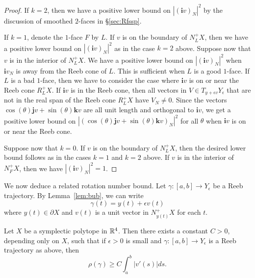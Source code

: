 \begin{proof}
If $k=2$, then we have a positive lower bound on $|({\mathbf i}v)_N|^2$ by the discussion of smoothed $2$-faces in \S\ref{sec:Rfssp}.

If $k=1$, denote the $1$-face $F$ by $L$. If $v$ is on the boundary of $N_L^+X$, then we have a positive lower bound on $|({\mathbf i}v)_N|^2$ as in the case $k=2$ above. Suppose now that $v$ is in the interior of $N_L^+X$. We have a positive lower bound on $|({\mathbf i}v)_N|^2$ when ${\mathbf i}v_N$ is away from the Reeb cone of $L$. This is sufficient when $L$ is a good $1$-face. If $L$ is a bad $1$-face, then we have to consider the case where ${\mathbf i}v$ is on or near the Reeb cone $R_L^+X$. If ${\mathbf i}v$ is in the Reeb cone, then all vectors in $V\in T_{y+\epsilon v}Y_\epsilon$ that are not in the real span of the Reeb cone $R_L^+X$ have $V_N\neq 0$. Since the vectors $\cos(\theta){\mathbf j}v + \sin(\theta){\mathbf k}v$ are all unit length and orthogonal to ${\mathbf i}v$, we get a positive lower bound on $\left|(\cos(\theta){\mathbf j}v + \sin(\theta){\mathbf k}v)_N\right|^2$ for all $\theta$ when ${\mathbf i}v$ is on or near the Reeb cone.

Suppose now that $k=0$. If $v$ is on the boundary of $N_L^+X$, then the desired lower bound follows as in the cases $k=1$ and $k=2$ above. If $v$ is in the interior of $N_F^+X$, then we have $|({\mathbf i}v)_N|^2=1$.
\end{proof}

We now deduce a related rotation number bound. Let $\gamma:[a,b]\to Y_\epsilon$ be a Reeb trajectory. By Lemma~\ref{lem:bub}, we can write
\[
\gamma(t) = y(t) + \epsilon v(t)
\]
where $y(t)\in \partial X$ and $v(t)$ is a unit vector in $N_{y(t)}^+X$ for each $t$. 

\begin{lemma}
\label{lem:rnlb2}
Let $X$ be a symplectic polytope in ${\mathbb R}^4$. Then there exists a constant $C>0$, depending only on $X$, such that if $\epsilon>0$ is small and $\gamma:[a,b]\to Y_\epsilon$ is a Reeb trajectory as above, then
\[
\rho(\gamma) \ge C \int_a^b|v'(s)|ds.
\]
\end{lemma}

